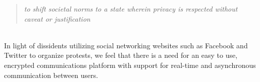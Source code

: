 \begin{quote}
\centering
\textit{to shift societal norms to a state wherein privacy is respected without
caveat or justification}
\end{quote}\\

In light of dissidents utilizing social networking websites such as Facebook and
Twitter to organize protests, we feel that there is a need for an easy to use,
encrypted communications platform with support for real-time and asynchronous
communication between users.
